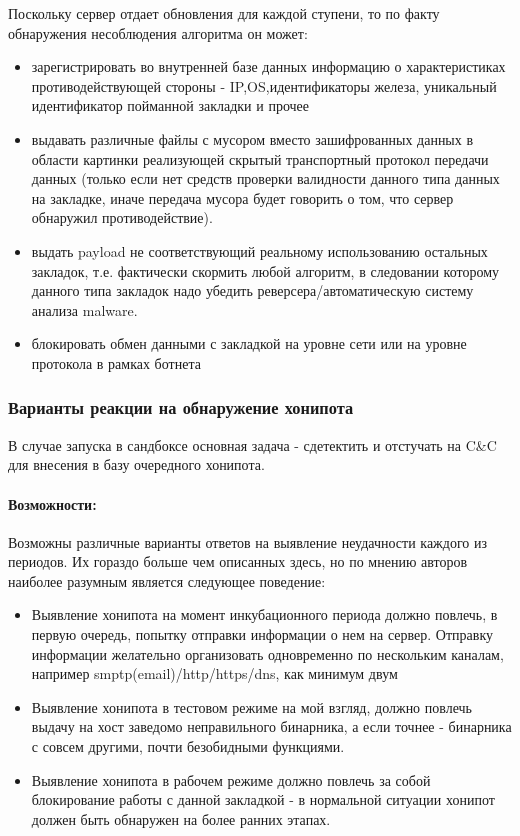 Поскольку сервер отдает обновления для каждой ступени, то по факту
обнаружения несоблюдения алгоритма он может:
\begin{itemize}
\item{зарегистрировать во внутренней базе данных информацию о характеристиках противодействующей стороны - IP,OS,идентификаторы железа, уникальный идентификатор пойманной закладки и прочее}
\item {выдавать различные файлы с
мусором вместо зашифрованных данных в области картинки реализующей
скрытый транспортный протокол передачи данных (только если нет средств
проверки валидности данного типа данных на закладке, иначе передача мусора
будет говорить о том, что сервер обнаружил противодействие).}
\item{выдать payload не соответствующий реальному использованию остальных закладок, т.е. фактически
 скормить любой алгоритм, в следовании которому данного типа закладок
 надо убедить реверсера/автоматическую систему анализа malware.}
\item{блокировать обмен данными с закладкой на уровне сети или на уровне протокола в рамках ботнета}

\end{itemize}

\subsubsection{Варианты реакции на обнаружение хонипота}

В случае запуска в сандбоксе основная задача - сдетектить и отстучать на C\&C для внесения в базу очередного хонипота.


\paragraph{Возможности:\\}
Возможны различные варианты ответов на выявление неудачности каждого из
периодов. Их гораздо больше чем описанных здесь, но по мнению авторов
наиболее разумным является следующее поведение:

\begin{itemize}
\item{Выявление хонипота на момент инкубационного периода должно
повлечь, в первую очередь,  попытку отправки информации о нем на
сервер. Отправку информации желательно организовать одновременно  по
нескольким каналам, например smptp(email)/http/https/dns, как минимум
 двум}

\item{Выявление хонипота в тестовом режиме на мой взгляд, должно
повлечь выдачу на хост заведомо неправильного бинарника, а если
точнее - бинарника с совсем другими, почти безобидными функциями.}

\item{Выявление хонипота в рабочем режиме должно повлечь за собой
 блокирование работы с данной закладкой - в нормальной ситуации
 хонипот должен быть обнаружен на более ранних этапах.}
\end{itemize}

